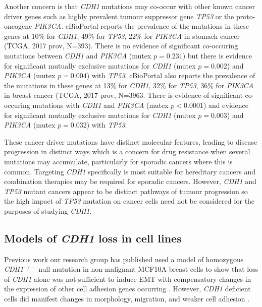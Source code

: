 Another concern is that \textit{CDH1} mutations may co-occur with other known cancer driver genes such as highly prevalent tumour suppressor gene \textit{\textit{TP53}} or the proto-oncogene \textit{\textit{PIK3CA}}. cBioPortal reports the prevalence of the mutations in these genes at 10\% for \textit{CDH1}, 49\% for \textit{\textit{TP53}}, 22\% for \textit{\textit{PIK3CA}} in stomach cancer (TCGA, 2017 prov, N=393). There is no evidence of significant co-occuring mutations between \textit{CDH1} and \textit{\textit{PIK3CA}} (mutex $p=0.231$) but there is evidence for significant mutually exclusive mutations for \textit{CDH1} (mutex $p=0.002$) and \textit{\textit{PIK3CA}} (mutex $p=0.004$) with \textit{\textit{TP53}}. cBioPortal also reports the prevalence of the mutations in these genes at 13\% for \textit{CDH1}, 32\% for \textit{\textit{TP53}}, 36\% for \textit{\textit{PIK3CA}} in breast cancer (TCGA, 2017 prov, N=3963. There is evidence of significant co-occuring mutations with \textit{CDH1} and \textit{\textit{PIK3CA}} (mutex $p<0.0001$) and evidence for significant mutually exclusive mutations for \textit{CDH1} (mutex $p=0.003$) and \textit{\textit{PIK3CA}} (mutex $p=0.032$) with \textit{\textit{TP53}}.

These cancer driver mutations have distinct molecular features, leading to disease progression in distinct ways which is a concern for drug resistance when several mutations may accumulate, particularly for sporadic cancers where this is common. Targeting \textit{CDH1} specifically is most suitable for hereditary cancers and combination therapies may be required for sporadic cancers. However, \textit{CDH1} and \textit{\textit{TP53}} mutant cancers appear to be distinct pathways of tumour progression so the high impact of \textit{\textit{TP53}} mutation on cancer cells need not be considered for the purposes of studying \textit{CDH1}.

\subsection{Models of \textit{CDH1} loss in cell lines}
Previous work our research group has published used a model of  homozygous \textit{CDH1}$^{-/-}$ null mutation in non-malignant MCF10A breast cells to show that loss of \textit{CDH1} alone was not sufficient to induce EMT with compensatory changes in the expression of other cell adhesion genes occurring \citep{Chen2014}. However, \textit{CDH1} deficient cells did manifest changes in morphology, migration, and weaker cell adhesion \citep{Chen2014}.

